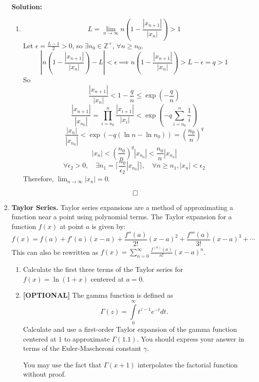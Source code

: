 \documentclass{article}
\newenvironment{solution}{\color{blue} \smallskip \textbf{Solution:}}{}
\begin{document}
\begin{enumerate}
\begin{solution}
\begin{enumerate}
            \item
            \[L = \lim_{n \to \infty} n\left(1 - \frac{|x_{n+1}|}{|x_n|}\right) > 1\]
            Let $\epsilon = \frac{L-1}{2} > 0$, so $\exists n_0 \in \mathbb{Z}^+$, $\forall n \geq n_0$, 
            $$\left|n\left(1 - \frac{|x_{n+1}|}{|x_n|}\right) - L \right| < \epsilon \implies n\left(1 - \frac{|x_{n+1}|}{|x_n|}\right) > L - \epsilon = q > 1$$
            So 
            $$\frac{|x_{n+1}|}{|x_n|} < 1 - \frac{q}{n} \leq \exp(-\frac{q}{n})$$
            $$
            \frac{|x_{n+1}|}{|x_{n_0}|} = \prod_{i=n_0}^n \frac{|x_{i+1}|}{|x_{i}|}<\exp(-q\sum_{i=n_0}^n \frac{1}{i})
            $$
            $$
            \frac{|x_{n}|}{|x_{n_0}|} < \exp(-q(\ln n - \ln n_0)) = \left(\frac{n_0}{n}\right)^q
            $$
            $$
            |x_n| < \left(\frac{n_0}{n}\right)^q |x_{n_0}| < \frac{n_0}{n} |x_{n_0}|
            $$
            $$
            \forall \epsilon_2 > 0,\quad \exists n_1 = \lceil \frac{n_0}{\epsilon_2}\left|x_{n_0}\right| \rceil, \quad \forall n \geq n_1, |x_n| < \epsilon_2
            $$
            Therefore, $\lim_{n\to \infty}|x_n| = 0$.
        \end{enumerate}
        \[ \qedhere \]
    \end{solution}

    \item
    \textbf{Taylor Series.} Taylor series expansions are a method of approximating a function near a point using polynomial terms. 
    The Taylor expansion for a function $f(x)$ at point $a$ is given by:
    \[
        f(x) = f(a) + f'(a)(x-a) + \frac{f''(a)}{2!}(x-a)^2 + \frac{f'''(a)}{3!}(x-a)^3 + \cdots
    \]
    This can also be rewritten as $f(x) = \sum_{n=0}^{\infty} \frac{f^{(n)}(a)}{n!} (x - a)^n$.
    \begin{enumerate}
        \item Calculate the first three terms of the Taylor series for $f(x)=\ln(1+x)$ centered at $a=0$.
        \item \textbf{[OPTIONAL]} The gamma function is defined as 
        \[
            \Gamma (z) = \int \limits_0^\infty t^{z-1} e^{-t} dt.
        \]
        Calculate and use a first-order Taylor expansion of the gamma function centered at $1$ to approximate $\Gamma(1.1)$. 
        You should express your answer in terms of the Euler-Mascheroni constant $\gamma$.

        You may use the fact that $\Gamma(x + 1)$ interpolates the factorial function without proof.
    \end{enumerate}


\end{enumerate}
\end{document}
